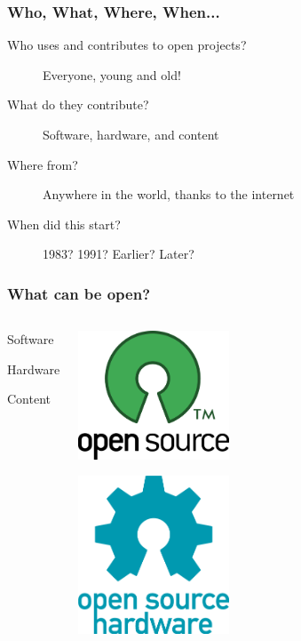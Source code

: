 \documentclass{beamer}
\begin{document}
\begin{frame}
  \frametitle{Who, What, Where, When...}
  \begin{description}
  \item[Who uses and contributes to open projects?] Everyone, young and old!
  \item[What do they contribute?] Software, hardware, and content
  \item[Where from?] Anywhere in the world, thanks to the internet
  \item[When did this start?] 1983? 1991? Earlier? Later?
  \end{description}
\end{frame}

\begin{frame}
  \frametitle{What can be open?}
  \begin{columns}
    \begin{center}
      \begin{LARGE}Software\end{LARGE}
      
      \vspace{5em}

      \begin{LARGE}Hardware\end{LARGE}

      \vspace{5em}

      \begin{LARGE}Content\end{LARGE}
    \end{center}
    \begin{center}
      \includegraphics[width=0.4\textwidth]{img/opensource}

      \vspace{1em}

      \includegraphics[width=0.4\textwidth]{img/opensourcehardware.png}


\end{center}
\end{columns}
\end{frame}
\end{document}
